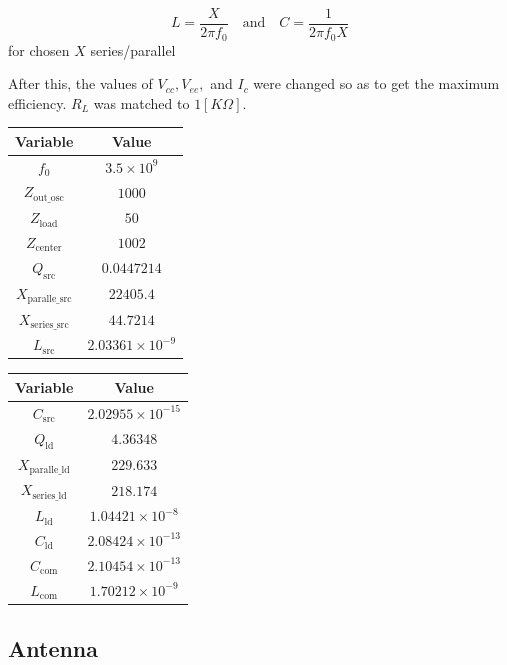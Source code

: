 \[L=\frac{X}{2\pi f_0} \quad \text{and} \quad C = \frac{1}{2\pi f_0 X}\]
for chosen \(X\) series/parallel

After this, the values of \(V_{cc}, V_{ee}, \) and \(I_c\) were changed so as to get the maximum efficiency. \(R_L\) was matched to \(1[K\Omega]\).

\begin{table}[!h]
\centering
\begin{tabular}{|c|c|}
    \hline
    \textbf{Variable} & \textbf{Value} \\
    \hline
    $f_0$ & $3.5 \times 10^9$ \\
    $Z_{\text{out\_osc}}$ & $1000$ \\
    $Z_{\text{load}}$ & $50$ \\
    $Z_{\text{center}}$ & $1002$ \\
    $Q_{\text{src}}$ & $0.0447214$ \\
    $X_{\text{paralle\_src}}$ & $22405.4$ \\
    $X_{\text{series\_src}}$ & $44.7214$ \\
    $L_{\text{src}}$ & $2.03361 \times 10^{-9}$ \\
    \hline
\end{tabular}
\end{table} 
\begin{table}[!h]
\centering
\begin{tabular}{|c|c|}
    \hline
    \textbf{Variable} & \textbf{Value} \\
    \hline
    $C_{\text{src}}$ & $2.02955 \times 10^{-15}$ \\
    $Q_{\text{ld}}$ & $4.36348$ \\
    $X_{\text{paralle\_ld}}$ & $229.633$ \\
    $X_{\text{series\_ld}}$ & $218.174$ \\
    $L_{\text{ld}}$ & $1.04421 \times 10^{-8}$ \\
    $C_{\text{ld}}$ & $2.08424 \times 10^{-13}$ \\
    $C_{\text{com}}$ & $2.10454 \times 10^{-13}$ \\
    $L_{\text{com}}$ & $1.70212 \times 10^{-9}$ \\
    \hline
\end{tabular}
\end{table} 

\subsection{Antenna}